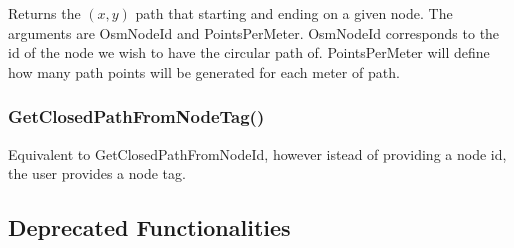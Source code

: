 Returns the $(x,y)$ path that starting and ending on a given node. The arguments are OsmNodeId and PointsPerMeter. OsmNodeId corresponds to the id of the node we wish to have the circular path of. PointsPerMeter will define how many path points will be generated for each meter of path.

\subsubsection{GetClosedPathFromNodeTag()}

Equivalent to GetClosedPathFromNodeId, however istead of providing a node id, the user provides a node tag.

\subsection{Deprecated Functionalities}

